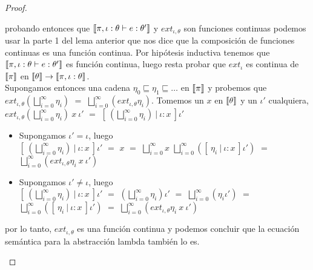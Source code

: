 \begin{proof}
\begin{itemize}
\begin{itemize}
probando entonces
que $\llbracket \pi,\iota:\theta \vdash e : \theta' \rrbracket$ y $ext_{\iota,\theta}$ son funciones 
continuas podemos usar la parte 1 del lema anterior que nos dice que la composici\'on
de funciones continuas es una funci\'on continua. Por hip\'otesis
inductiva tenemos que $\llbracket \pi,\iota:\theta \vdash e : \theta' \rrbracket$ es funci\'on
continua, luego resta probar que $ext_\iota$ es continua de $\llbracket \pi \rrbracket$ en 
$\llbracket \theta \rrbracket \rightarrow \llbracket \pi,\iota:\theta \rrbracket$.\\

Supongamos entonces una cadena $\eta_0 \sqsubseteq \eta_1 \sqsubseteq \ldots$ en 
$\llbracket \pi \rrbracket$
y probemos que $ext_{\iota,\theta} (\bigsqcup\limits^{\infty}_{i=0} \eta_i)$ $=$
$\bigsqcup\limits^{\infty}_{i=0} (ext_{\iota,\theta} \eta_i)$. Tomemos un $x$ en $\llbracket \theta \rrbracket$
y un $\iota'$ cualquiera,\\

$ext_{\iota,\theta} (\bigsqcup\limits^{\infty}_{i=0} \eta_i) \ x \ \iota'$ $=$
$[ \ (\bigsqcup\limits^{\infty}_{i=0} \eta_i) \ | \ \iota:x \ ] \iota'$

\begin{itemize}
\item Supongamos $\iota' = \iota$, luego \\

$[ \ (\bigsqcup\limits^{\infty}_{i=0} \eta_i) \ | \ \iota:x \ ] \iota'$ $=$
$x$ $=$ $\bigsqcup\limits^{\infty}_{i=0} x$ $\bigsqcup\limits^{\infty}_{i=0} 
([ \ \eta_i \ | \ \iota:x \ ] \iota')$ $=$ $\bigsqcup\limits^{\infty}_{i=0} 
(ext_{\iota,\theta} \eta_i \ x \ \iota')$\\

\item Supongamos $\iota' \neq \iota$, luego \\

$[ \ (\bigsqcup\limits^{\infty}_{i=0} \eta_i) \ | \ \iota:x \ ] \iota'$ $=$
$(\bigsqcup\limits^{\infty}_{i=0} \eta_i) \iota'$ $=$
$\bigsqcup\limits^{\infty}_{i=0} (\eta_i \iota')$ $=$
$\bigsqcup\limits^{\infty}_{i=0} ([ \ \eta_i \ | \ \iota:x \ ] \iota')$ $=$
$\bigsqcup\limits^{\infty}_{i=0} (ext_{\iota,\theta} \eta_i \ x \ \iota')$\\
\end{itemize}

por lo tanto, $ext_{\iota,\theta}$ es una funci\'on continua y podemos concluir que
la ecuaci\'on sem\'antica para la abstracci\'on lambda tambi\'en lo es.
\end{itemize}
\end{itemize}
\end{proof}

